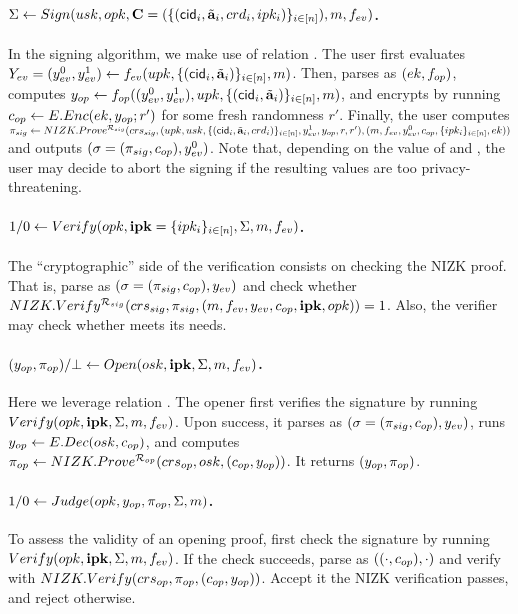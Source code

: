 \paragraph{$\Sigma \gets Sign(usk,opk,
  \mathbf{C}=(\lbrace (\mathsf{cid}_i,\tilde{\mathbf{a}}_i,crd_i,ipk_i)\rbrace_{i\in[n]}),
  m,f_{ev})$.} %
In the signing algorithm, we make use of relation \RelSig.
% 
The user first evaluates $Y_{ev} = (y_{ev}^0,y_{ev}^1) \gets f_{ev} (upk,
\lbrace(\mathsf{cid}_i,\tilde{\mathbf{a}}_i)\rbrace_{i\in[n]},m)$. Then, parses \opk as $(ek,
f_{op})$, computes $y_{op} \gets f_{op}((y_{ev}^0,y_{ev}^1),upk,
\lbrace(\mathsf{cid}_i,\tilde{\mathbf{a}}_i)\rbrace_{i\in[n]},m)$, and encrypts
\yinsp by running $c_{op} \gets E.Enc(ek,y_{op}; r')$ for some fresh
randomness $r'$. Finally, the user computes $\pi_{sig} \gets
NIZK.Prove^{\mathcal{R}_{sig}}(crs_{sig},(upk,usk,\lbrace(\mathsf{cid}_i,
\tilde{\mathbf{a}}_i,crd_i)\rbrace_{i\in[n]},y_{ev}^1,y_{op},r,r'),(m,
f_{ev},y_{ev}^0,c_{op},\lbrace ipk_i\rbrace_{i\in[n]},ek))$ and outputs
$(\sigma = (\pi_{sig},c_{op}),y_{ev}^0)$. Note that, depending on the value of
\Yeval and \yinsp, the user may decide to abort
the signing if the resulting values are too privacy-threatening.

\paragraph{$1/0 \gets Verify(opk,\mathbf{ipk}=\lbrace ipk_i\rbrace_{i\in[n]},
  \Sigma,m,f_{ev})$.} %
The ``cryptographic'' side of the verification consists on checking
the NIZK proof. That is, parse \Sig as $(\sigma = (\pi_{sig},c_{op}),y_{ev})$ and
check whether $NIZK.Verify^{\mathcal{R}_{sig}}(crs_{sig},\pi_{sig},(m,f_{ev},y_{ev},
c_{op},\mathbf{ipk},opk)) = 1$. Also, the verifier may check whether \yeval meets its
needs.

\paragraph{$(y_{op},\pi_{op})/\bot \gets
  Open(osk,\mathbf{ipk},\Sigma,m,f_{ev})$.} %
Here we leverage relation \RelIns.
%
The opener first verifies the signature by running $Verify
(opk,\mathbf{ipk}, \Sigma,m,f_{ev})$. Upon success, it parses
\Sig as $(\sigma=(\pi_{sig},c_{op}),y_{ev})$, runs $y_{op}
\gets E.Dec(osk,c_{op})$, and computes $\pi_{op} \gets
NIZK.Prove^{\mathcal{R}_{op}}(crs_{op},osk,(c_{op},y_{op}))$. It
returns $(y_{op},\pi_{op})$.

\paragraph{$1/0 \gets Judge(opk,y_{op},\pi_{op},\Sigma,m)$.} %
To assess the validity of an opening proof, first check the signature
by running $Verify(opk,\mathbf{ipk},\Sigma,m,f_{ev})$. If the check succeeds,
parse \Sig as $((\cdot,c_{op}),\cdot)$ and verify \NIZKproof with
$NIZK.Verify(crs_{op},\pi_{op},(c_{op},y_{op}))$. Accept it the NIZK
verification passes, and reject otherwise.

